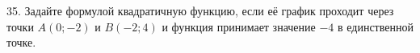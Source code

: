 35. Задайте формулой квадратичную функцию, если её график проходит через точки $A(0;-2)$ и $B(-2;4)$ и функция принимает значение $-4$ в единственной точке.\\
